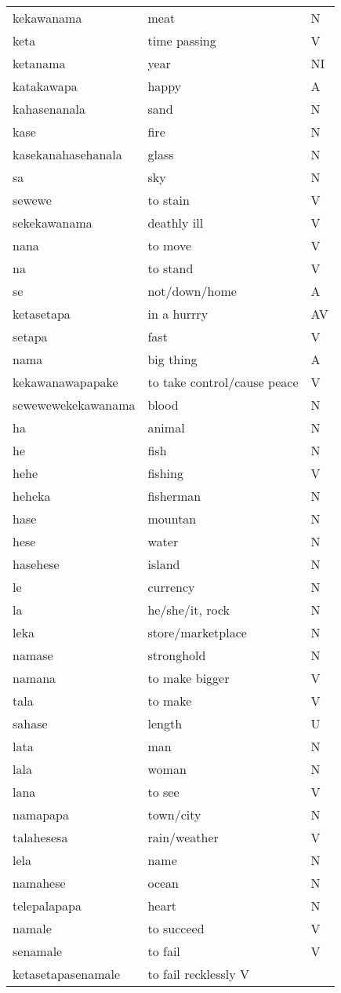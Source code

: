 \documentclass{article}
\begin{document}
\begin{tabular}{|l|l|l|}
kekawanama&meat&N\\
keta&time passing&V\\
ketanama&year&NI\\
katakawapa&happy&A\\
kahasenanala&sand&N\\
kase&fire&N\\
kasekanahasehanala&glass&N\\
sa&sky&N\\
sewewe&to stain&V\\
sekekawanama&deathly ill&V\\
nana&to move&V\\
na&to stand&V\\
se&not/down/home&A\\
ketasetapa&in a hurrry&AV\\
setapa&fast&V\\
nama&big thing&A\\
kekawanawapapake&to take control/cause peace&V\\
sewewewekekawanama&blood&N\\
ha&animal&N\\
he&fish&N\\
hehe&fishing&V\\
heheka&fisherman&N\\
hase&mountan&N\\
hese&water&N\\
hasehese&island&N\\
le&currency&N\\
la&he/she/it, rock&N\\
leka&store/marketplace&N\\
namase&stronghold&N\\
namana&to make bigger&V\\
tala&to make&V\\
sahase&length&U\\
lata&man&N\\
lala&woman&N\\
lana&to see&V\\
namapapa&town/city&N\\
talahesesa&rain/weather&V\\
lela&name&N\\
namahese&ocean&N\\
telepalapapa&heart&N\\
namale&to succeed&V\\
senamale&to fail&V\\
ketasetapasenamale&to fail recklessly   V\\

\end{tabular}
\end{document}
